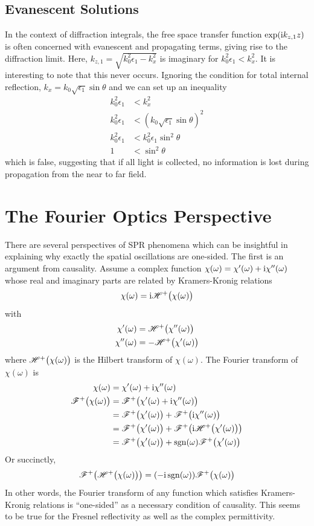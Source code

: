 \subsection{Evanescent Solutions}
In the context of diffraction integrals, the free space transfer function
$\exp({\mathrm{i}} k_{z,1} z)$ is often concerned with evanescent and propagating
terms, giving rise to the diffraction limit.  Here,
$k_{z,1}=\sqrt{k_0^2 \epsilon_1 - k_x^2}$ is imaginary for $k_0^2
\epsilon_1 < k_x^2$.  It is interesting to note that this never occurs.
Ignoring the condition for total internal reflection, 
$k_x = k_0 \sqrt{\epsilon_1} \sin \theta$ and we can set up an inequality
\begin{align}
k_0^2 \epsilon_1 &< k_x^2\\
k_0^2 \epsilon_1 &< \left(k_0 \sqrt{\epsilon_1} \sin \theta\right)^2\\
k_0^2 \epsilon_1 &< k_0^2 \epsilon_1 \sin^2 \theta\\
1 &< \sin^2 \theta
\end{align}
which is false, suggesting that if all light is collected, no information is
lost during propagation from the near to far field.
\section{The Fourier Optics Perspective}
There are several perspectives of SPR phenomena which can be insightful in
explaining why exactly the spatial oscillations are one-sided.  The first
is an argument from causality.  Assume a complex function $\chi(\omega) =
\chi'(\omega) + {\mathrm{i}} \chi''(\omega)$ whose real and imaginary parts are
related by Kramers-Kronig relations
\begin{align}
\chi(\omega)={\mathrm{i}} {\mathscr{H}^{+}\bigl(\chi(\omega)\bigr)}
\end{align}
with 
\begin{align}
\chi'(\omega) &= {\mathscr{H}^{+}\bigl(\chi''(\omega)\bigr)}\\
\chi''(\omega) &= -{\mathscr{H}^{+}\bigl(\chi'(\omega)\bigr)}
\end{align}
where ${\mathscr{H}^{+}\bigl(\chi(\omega)\bigr)}$ is the Hilbert transform of $\chi(\omega)$.
The Fourier transform of $\chi(\omega)$ is
\begin{align}
\chi(\omega) &= \chi'(\omega) + {\mathrm{i}} \chi''(\omega)\\
{\mathscr{F}^{+}\bigl(\chi(\omega)\bigr)} &= {\mathscr{F}^{+}\bigl(\chi'(\omega) + {\mathrm{i}} \chi''(\omega)\bigr)}\\
&= {\mathscr{F}^{+}\bigl(\chi'(\omega)\bigr)} + {\mathscr{F}^{+}\bigl({\mathrm{i}} \chi''(\omega)\bigr)}\\
&= {\mathscr{F}^{+}\bigl(\chi'(\omega)\bigr)} + {\mathscr{F}^{+}\bigl({\mathrm{i}} {\mathscr{H}^{+}\bigl(\chi'(\omega)\bigr)}\bigr)} \\
&= {\mathscr{F}^{+}\bigl(\chi'(\omega)\bigr)} + \operatorname{sgn}(\omega) {\mathscr{F}^{+}\bigl(\chi'(\omega)\bigr)} \\
\end{align}
Or succinctly,
\begin{align}
{\mathscr{F}^{+}\bigl({\mathscr{H}^{+}\bigl(\chi(\omega)\bigr)}\bigr)} = (-{\mathrm{i}} \operatorname{sgn}(\omega)) {\mathscr{F}^{+}\bigl(\chi(\omega)\bigr)}
\end{align}
In other words, the Fourier transform of any function which satisfies
Kramers-Kronig relations is ``one-sided'' as a necessary
condition of causality.  This seems to be true for the Fresnel
reflectivity as well as the complex permittivity.

